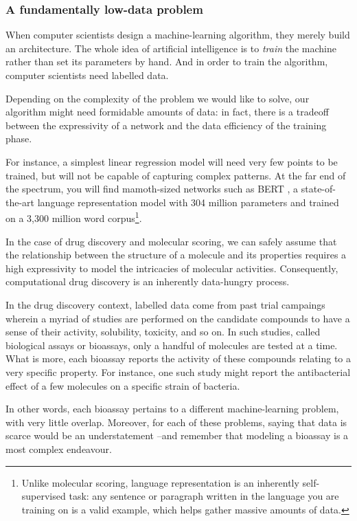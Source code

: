 \documentclass[11pt]{article}
\numberwithin{equation}{subsection}
\begin{document}
\subsubsection{A fundamentally low-data problem}
\label{sec:low-data}

When computer scientists design a machine-learning algorithm, they merely build an architecture. The whole idea of artificial intelligence is to \textit{train} the machine rather than set its parameters by hand. And in order to train the algorithm, computer scientists need labelled data.

Depending on the complexity of the problem we would like to solve, our algorithm might need formidable amounts of data: in fact, there is a tradeoff between the expressivity of a network and the data efficiency of the training phase.

For instance, a simplest linear regression model will need very few points to be trained, but will not be capable of capturing complex patterns. At the far end of the spectrum, you will find mamoth-sized networks such as BERT \citep{devlin2018bert}, a state-of-the-art language representation model with 304 million parameters and trained on a 3,300 million word corpus\footnote{Unlike molecular scoring, language representation is an inherently self-supervised task: any sentence or paragraph written in the language you are training on is a valid example, which helps gather massive amounts of data.}.

In the case of drug discovery and molecular scoring, we can safely assume that the relationship between the structure of a molecule and its properties requires a high expressivity to model the intricacies of molecular activities. Consequently, computational drug discovery is an inherently data-hungry process.

In the drug discovery context, labelled data come from past trial campaings wherein a myriad of studies are performed on the candidate compounds to have a sense of their activity, solubility, toxicity, and so on. In such studies, called biological assays or bioassays, only a handful of molecules are tested at a time. What is more, each bioassay reports the activity of these compounds relating to a very specific property. For instance, one such study might report the antibacterial effect of a few molecules on a specific strain of bacteria.

In other words, each bioassay pertains to a different machine-learning problem, with very little overlap. Moreover, for each of these problems, saying that data is scarce would be an understatement –and remember that modeling a bioassay is a most complex endeavour.
\end{document}
